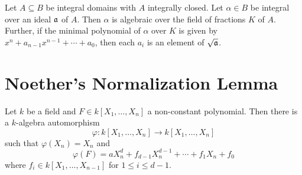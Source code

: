 \begin{proposition}
    Let $A\subseteq B$ be integral domains with $A$ integrally closed. Let $\alpha\in B$ be integral over an ideal $\mathfrak a$ of $A$. Then $\alpha$ is algebraic over the field of fractions $K$ of $A$. Further, if the minimal polynomial of $\alpha$ over $K$ is given by $x^n + a_{n - 1}x^{n - 1} + \cdots + a_0$, then each $a_i$ is an element of $\sqrt{\mathfrak a}$.
\end{proposition}

\section{Noether's Normalization Lemma}

\begin{lemma}
    Let $k$ be a field and $F\in k[X_1,\dots,X_n]$ a non-constant polynomial. Then there is a $k$-algebra automorphism 
    \begin{equation*}
        \varphi: k[X_1,\dots,X_n]\to k[X_1,\dots,X_n]
    \end{equation*}
    such that $\varphi(X_n) = X_n$ and 
    \begin{equation*}
        \varphi(F) = aX_n^d + f_{d - 1}X_n^{d - 1} + \cdots + f_1X_n + f_0
    \end{equation*}
    where $f_i\in k[X_1,\dots,X_{n - 1}]$ for $1\le i\le d - 1$.
\end{lemma}
